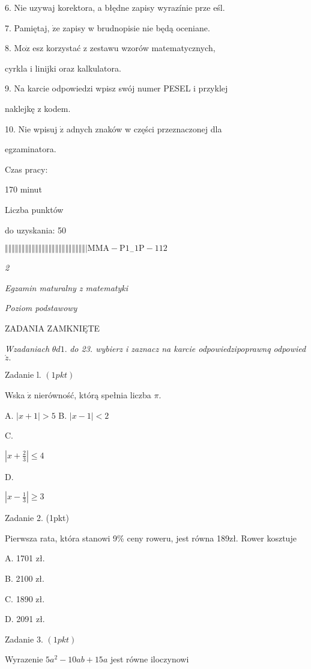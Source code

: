 \documentclass[a4paper,12pt]{article}
\begin{document}
6. Nie uzywaj korektora, a błędne zapisy wyrazínie prze eśl.

7. Pamiętaj, $\dot{\mathrm{z}}\mathrm{e}$ zapisy w brudnopisie nie będą oceniane.

8. $\mathrm{M}\mathrm{o}\dot{\mathrm{z}}$ esz korzystać z zestawu wzorów matematycznych,

cyrkla i linijki oraz kalkulatora.

9. Na karcie odpowiedzi wpisz swój numer PESEL i przyklej

naklejkę z kodem.

10. Nie wpisuj $\dot{\mathrm{z}}$ adnych znaków w części przeznaczonej dla

egzaminatora.

Czas pracy:

170 minut

Liczba punktów

do uzyskania: 50

$\Vert\Vert\Vert\Vert\Vert\Vert\Vert\Vert\Vert\Vert\Vert\Vert\Vert\Vert\Vert\Vert\Vert\Vert\Vert\Vert\Vert\Vert\Vert\Vert|  \mathrm{M}\mathrm{M}\mathrm{A}-\mathrm{P}1_{-}1\mathrm{P}-112$




{\it 2}

{\it Egzamin maturalny z matematyki}

{\it Poziom podstawowy}

ZADANIA ZAMKNIĘTE

{\it Wzadaniach} $\theta d1.$ {\it do 23. wybierz i zaznacz na karcie odpowiedzipoprawnq odpowied} $\acute{z}.$

Zadanie l. $(1pkt)$

Wska $\dot{\mathrm{z}}$ nierówność, którą spełnia liczba $\pi.$

A. $|x+1|>5$ B. $|x-1|<2$

C.

$|x+\displaystyle \frac{2}{3}|\leq 4$

D.

$|x-\displaystyle \frac{1}{3}|\geq 3$

Zadanie 2. (1pkt)

Pierwsza rata, która stanowi 9\% ceny roweru, jest równa 189zł. Rower kosztuje

A. 1701 zł.

B. 2100 zł.

C. 1890 zł.

D. 2091 zł.

Zadanie 3. $(1pkt)$

Wyrazenie $5a^{2}-10ab+15a$ jest równe iloczynowi
\end{document}
